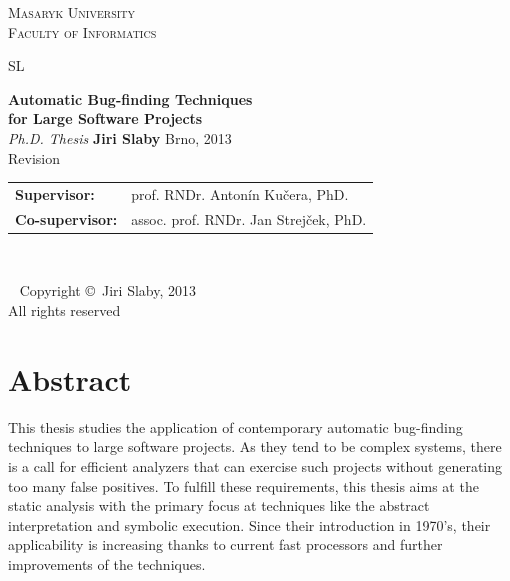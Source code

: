 \documentclass[11pt,a4paper]{book}
\begin{document}
\frontmatter
\pagestyle{plain}

\begin{titlepage}
\vspace{2cm}
\begin{center}
     \textsc{Masaryk University\\Faculty of Informatics}

     \vspace{1cm}
     \logo SL

     \vspace{2cm}
     \huge{\textbf{Automatic Bug-finding Techniques\\[0.5em]
     for Large Software Projects}}
     \\[1.5cm]

     \Large{\textit{Ph.D. Thesis}}
     \vfill
     \Large{\textbf{Jiri Slaby}}
     \vfill
     \large{Brno, 2013}\\[2mm]
     \small{Revision }
     \\[1.5cm]
\end{center}
  \begin{tabular}{ll}
  \textbf{Supervisor:} & prof. RNDr. Antonín Kučera, PhD.\\
  \textbf{Co-supervisor:} & assoc. prof. RNDr. Jan Strejček, PhD.
  \end{tabular}
\end{titlepage}

\clearpage
~
\newpage

\begin{center}
~
\vfill
Copyright \copyright\ Jiri Slaby, 2013 \\
All rights reserved
\end{center}

\chapter*{Abstract}
This thesis studies the application of contemporary automatic bug-finding
techniques to large software projects. As they tend to be complex systems,
there is a call for efficient analyzers that can exercise such projects
without generating too many false positives. To fulfill these requirements,
this thesis aims at the static analysis with the primary focus at techniques
like the abstract interpretation and symbolic execution.  Since their
introduction in 1970's, their applicability is increasing thanks to current
fast processors and further improvements of the techniques.
\end{document}
